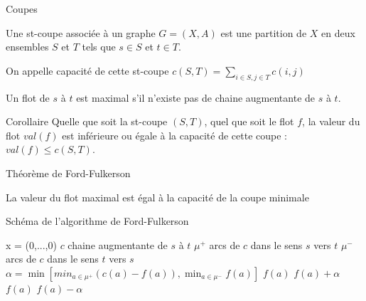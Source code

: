 \begin{frame}{Coupes}
    \begin{definition}
        Une st-coupe associée à un graphe $G=(X,A)$ est une partition de $X$ en deux ensembles $S$ et $T$ tels que $s \in S$ et $t \in T$. 
        
        On appelle capacité de cette st-coupe $c(S,T) = \sum_{i \in S, j \in T} c(i,j)$ 
    \end{definition}
    \begin{theorem}
        Un flot de $s$ à $t$ est maximal s'il n'existe pas de chaine augmentante de $s$ à $t$.
    \end{theorem}
    \begin{block}{Corollaire}
        Quelle que soit la st-coupe $(S,T)$, quel que soit le flot $f$, la valeur du flot $val(f)$ est inférieure ou égale à la capacité de cette coupe : $val(f) \leq c(S,T)$.
    \end{block}
\end{frame}

\begin{frame}{Théorème de Ford-Fulkerson}
    \begin{theorem}
        La valeur du flot maximal est égal à la capacité de la coupe minimale 
    \end{theorem}
\end{frame}

\begin{frame}{Schéma de l'algorithme de Ford-Fulkerson}
\label{alg:ford-fulkerson}
    \begin{algorithmic}
        \State x = (0,...,0) 
            \State $c$ \gets chaine augmentante de $s$ à $t$
            \State $\mu^+$ \gets arcs de $c$ dans le sens $s$ vers $t$ 
            \State $\mu^-$ \gets arcs de $c$ dans le sens $t$ vers $s$
            \State $\alpha = \min \left[ 
                min_{a \in \mu^+} (c(a) - f(a)) , \min_{a \in \mu^- } f(a)
            \right]$
                $f(a)$ \gets $f(a)+\alpha$
            \EndFor
                $f(a)$ \gets $f(a)-\alpha$
            \EndFor
        \EndWhile
        \EndFunction
    \end{algorithmic}
\end{frame}

